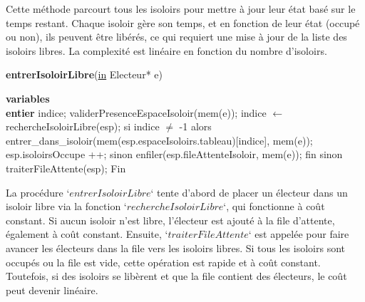 \documentclass[12pt]{article} %
\begin{document}
Cette méthode parcourt tous les isoloirs pour mettre à jour leur état basé sur le temps restant. Chaque isoloir gère son temps, et en fonction de leur état (occupé ou non), ils peuvent être libérés, ce qui requiert une mise à jour de la liste des isoloirs libres. La complexité est linéaire en fonction du nombre d'isoloirs.

\begin{algorithm}
	\caption{\textbf{entrerIsoloirLibre}(\underline{in} Electeur* e)}
	\begin{algorithmic}[1]
		\State \textbf{variables}\\ \textbf{entier} indice;
		\Start
		\State validerPresenceEspaceIsoloir(mem(e)); 
		\State indice $\leftarrow$ rechercheIsoloirLibre(esp);
		\State si indice $\neq$ -1 alors  
		\State  \hspace{\algorithmicindent} entrer\_dans\_isoloir(mem(esp.espaceIsoloirs.tableau)[indice], mem(e));
		\State \hspace{\algorithmicindent} esp.isoloirsOccupe ++;
		\State sinon
		\State \hspace{\algorithmicindent} enfiler(esp.fileAttenteIsoloir, mem(e));
		\State fin sinon
		\State traiterFileAttente(esp);
		\State Fin
	\end{algorithmic}
\end{algorithm}
La procédure `$entrerIsoloirLibre$` tente d'abord de placer un électeur dans un isoloir libre via la fonction `$rechercheIsoloirLibre$`, qui fonctionne à coût constant. Si aucun isoloir n'est libre, l'électeur est ajouté à la file d'attente, également à coût constant. Ensuite, `$traiterFileAttente$` est appelée pour faire avancer les électeurs dans la file vers les isoloirs libres. Si tous les isoloirs sont occupés ou la file est vide, cette opération est rapide et à coût constant. Toutefois, si des isoloirs se libèrent et que la file contient des électeurs, le coût peut devenir linéaire.

\newpage
\end{document}
